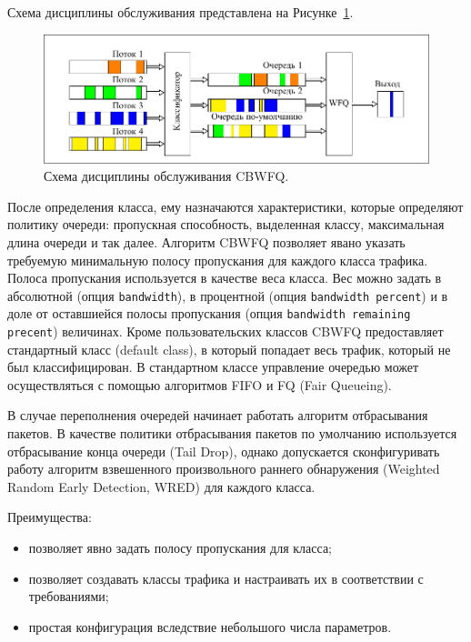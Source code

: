 	Схема дисциплины обслуживания представлена на Рисунке~\ref{pic:cbwfqscheme}. 

 	\begin{figure}[ht!]
		\center
    	\includegraphics[scale=1.3]{pdfimages/cbwfq.pdf}
		\caption{Схема дисциплины обслуживания CBWFQ.}
		\label{pic:cbwfqscheme}
	\end{figure}   

    После определения класса, ему назначаются характеристики, которые определяют
    политику очереди: пропускная способность, выделенная классу, максимальная
    длина очереди и так далее. Алгоритм CBWFQ позволяет явано указать требуемую минимальную
    полосу пропускания для каждого класса трафика. Полоса пропускания используется
    в качестве веса класса. Вес можно задать в абсолютной (опция \texttt{bandwidth}),
    в процентной (опция \texttt{bandwidth percent}) и в доле от оставшиейся
    полосы пропускания (опция \texttt{bandwidth remaining precent}) величинах.
    Кроме пользовательских классов CBWFQ предоставляет стандартный класс (default class),
    в который попадает весь трафик, который не был классифицирован. В стандартном классе
    управление очередью может осуществляться с помощью алгоритмов FIFO и FQ (Fair Queueing). \cite{ciscoguide} 

    В случае переполнения очередей начинает работать алгоритм отбрасывания пакетов.
    В качестве политики отбрасывания пакетов по умолчанию используется отбрасывание конца
    очереди (Tail Drop), однако допускается сконфигуривать работу
    алгоритм взвешенного произвольного раннего обнаружения (Weighted Random Early Detection, WRED)
    для каждого класса.\cite{ciscoguide}

	Преимущества:
	\begin{itemize}
		\item позволяет явно задать полосу пропускания для класса;
		\item позволяет создавать классы трафика и настраивать их в соответствии с требованиями;
		\item простая конфигурация вследствие небольшого числа параметров.\cite{Vagesna}\cite{ciscoguide}
	\end{itemize}

